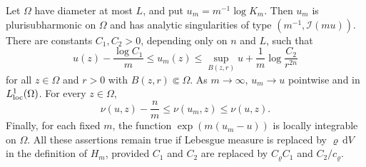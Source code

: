 \begin{theorem}\label{thm:local-bergman-approximation}
Let $\Omega$ have diameter at most $L$, and put $u_m=m^{-1}\log K_m$. Then $u_m$ is plurisubharmonic on $\Omega$ and has analytic singularities of type $(m^{-1},\mathcal I(mu))$. There are constants $C_1,C_2>0$, depending only on $n$ and $L$, such that
\begin{equation}\label{eq:local-bergman-bounds}
 u(z)-\frac{\log C_1}{m}\leq u_m(z)
 \leq\sup_{B(z,r)}u+\frac1m\log\frac{C_2}{r^{2n}}
\end{equation}
for all $z\in\Omega$ and $r>0$ with $B(z,r)\Subset\Omega$. As $m\to\infty$, $u_m\to u$ pointwise and in $L^1_{\mathrm{loc}}(\Omega)$. For every $z\in\Omega$,
\begin{equation}\label{eq:local-bergman-lelong}
 \nu(u,z)-\frac nm\leq\nu(u_m,z)\leq\nu(u,z).
\end{equation}
Finally, for each fixed $m$, the function $\exp(m(u_m-u))$ is locally integrable on $\Omega$. All these assertions remain true if Lebesgue measure is replaced by $\varrho\,\mathrm dV$ in the definition of $H_m$, provided $C_1$ and $C_2$ are replaced by $C_\varrho C_1$ and $C_2/c_\varrho$.
\end{theorem}
